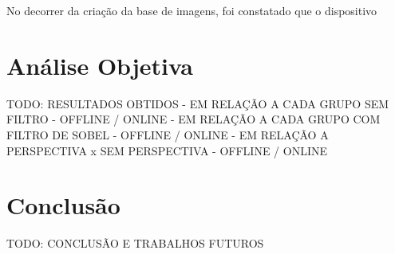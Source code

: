  
 No decorrer da criação da base de imagens, foi constatado que o dispositivo %
 
 
 
 \section{Análise Objetiva}
 
TODO: RESULTADOS OBTIDOS
 - EM RELAÇÃO A CADA GRUPO SEM FILTRO - OFFLINE / ONLINE
 - EM RELAÇÃO A CADA GRUPO COM FILTRO DE SOBEL - OFFLINE / ONLINE
 - EM RELAÇÃO A PERSPECTIVA x SEM PERSPECTIVA - OFFLINE / ONLINE
 


\section{Conclusão}
TODO: CONCLUSÃO E TRABALHOS FUTUROS

